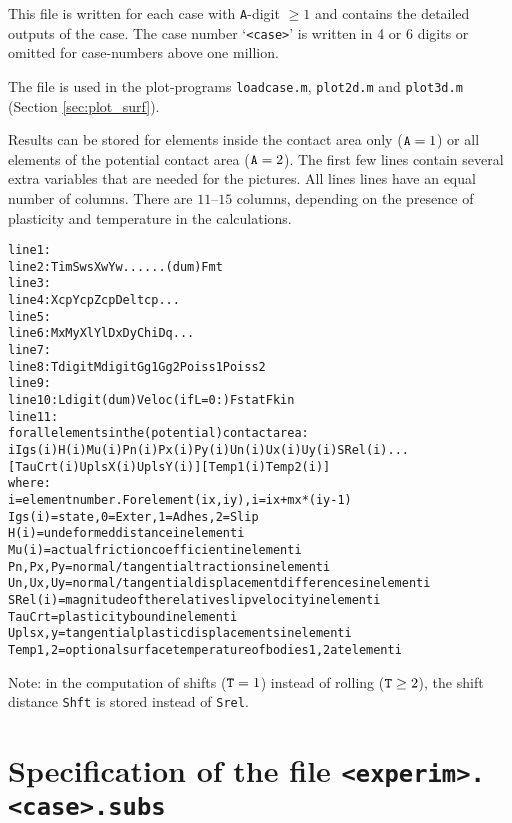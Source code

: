 \documentclass[12pt]{report}
\begin{document}
This file is written for each case with {\tt A}-digit $\ge 1$ and contains
the detailed outputs of the case. The case number `{\tt <case>}' is
written in 4 or 6 digits or omitted for case-numbers above one million.

The file is used in the plot-programs {\tt loadcase.m}, {\tt plot2d.m} and
{\tt plot3d.m} (Section \ref{sec:plot_surf}).

Results can be stored for elements inside the contact area only
(${\tt A}=1$) or all elements of the potential contact area (${\tt
A}=2$). The first few lines contain several extra variables that are needed
for the pictures. All lines lines have an equal number of columns. There
are $11\text{--}15$ columns, depending on the presence of plasticity and
temperature in the calculations.
\begin{alltt}\small
 line  1: % comment line, describing wheel and rail markers
 line  2:   Tim   Sws   Xw    Yw      ...                 ...   (dum)  Fmt
 line  3: % comment line, describing contact reference position
 line  4:   Xcp   Ycp   Zcp   Deltcp  ...
 line  5: % comment line, describing grid discretisation variables
 line  6:   Mx    My    Xl    Yl    Dx    Dy   Chi   Dq  ...
 line  7: % comment line, describing the material parameters used
 line  8:   Tdigit Mdigit Gg1    Gg2    Poiss1 Poiss2
 line  9: % comment line, describing the friction law used
 line 10:   Ldigit  (dum)  Veloc  (if L=0:) Fstat  Fkin
 line 11: % comment line, describing columns of the table
 for all elements in the (potential) contact area:
   i  Igs(i)  H(i)  Mu(i)  Pn(i)  Px(i)  Py(i)  Un(i)  Ux(i)  Uy(i)  SRel(i) ...
                            [ TauCrt(i) UplsX(i) UplsY(i) ] [ Temp1(i) Temp2(i)]
 where:
   i        = element number. For element (ix,iy), i = ix + mx*(iy-1)
   Igs(i)   = state, 0=Exter, 1=Adhes, 2=Slip
   H(i)     = undeformed distance in element i
   Mu(i)    = actual friction coefficient in element i
   Pn,Px,Py = normal/tangential tractions in element i
   Un,Ux,Uy = normal/tangential displacement differences in element i
   SRel(i)  = magnitude of the relative slip velocity in element i
   TauCrt   = plasticity bound in element i
   Uplsx,y  = tangential plastic displacements in element i
   Temp1,2  = optional surface temperature of bodies 1, 2 at element i
\end{alltt}
Note: in the computation of shifts (${\tt T}=1$) instead of rolling
(${\tt T}\ge 2$), the shift distance {\tt Shft} is stored instead of
{\tt Srel}.

\section{Specification of the file {\tt <experim>.<case>.subs}}
\label{sec:spec_subs}
\end{document}
